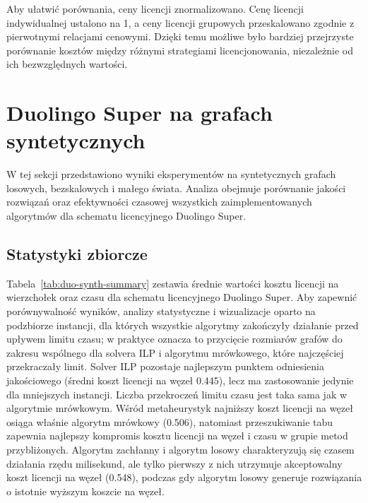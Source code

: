 Aby ułatwić porównania, ceny licencji znormalizowano. Cenę licencji indywidualnej ustalono na 1, a ceny licencji grupowych przeskalowano zgodnie z pierwotnymi relacjami cenowymi. Dzięki temu możliwe było bardziej przejrzyste porównanie kosztów między różnymi strategiami licencjonowania, niezależnie od ich bezwzględnych wartości.

\section{Duolingo Super na grafach syntetycznych}

W tej sekcji przedstawiono wyniki eksperymentów na syntetycznych grafach losowych, bezskalowych i małego świata. Analiza obejmuje porównanie jakości rozwiązań oraz efektywności czasowej wszystkich zaimplementowanych algorytmów dla schematu licencyjnego Duolingo Super.

\subsection{Statystyki zbiorcze}
Tabela~\ref{tab:duo-synth-summary} zestawia średnie wartości kosztu licencji na wierzchołek oraz czasu dla schematu licencyjnego Duolingo Super. Aby zapewnić porównywalność wyników, analizy statystyczne i wizualizacje oparto na podzbiorze instancji, dla których wszystkie algorytmy zakończyły działanie przed upływem limitu czasu; w praktyce oznacza to przycięcie rozmiarów grafów do zakresu wspólnego dla solvera ILP i algorytmu mrówkowego, które najczęściej przekraczały limit. Solver ILP pozostaje najlepszym punktem odniesienia jakościowego (średni koszt licencji na węzeł 0.445), lecz ma zastosowanie jedynie dla mniejszych instancji. Liczba przekroczeń limitu czasu jest taka sama jak w algorytmie mrówkowym. Wśród metaheurystyk najniższy koszt licencji na węzeł osiąga właśnie algorytm mrówkowy (0.506), natomiast przeszukiwanie tabu zapewnia najlepszy kompromis kosztu licencji na węzeł i czasu w grupie metod przybliżonych. Algorytm zachłanny i algorytm losowy charakteryzują się czasem działania rzędu milisekund, ale tylko pierwszy z nich utrzymuje akceptowalny koszt licencji na węzeł (0.548), podczas gdy algorytm losowy generuje rozwiązania o istotnie wyższym koszcie na węzeł.

